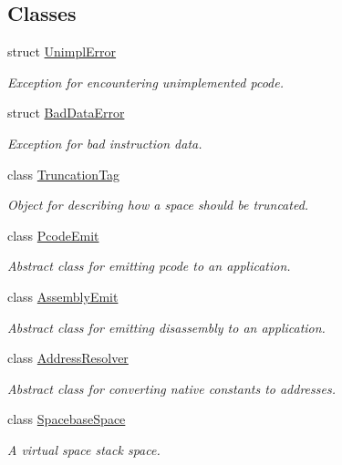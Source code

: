\subsection*{Classes}
\begin{DoxyCompactItemize}
\item 
struct \mbox{\hyperlink{struct_unimpl_error}{Unimpl\+Error}}
\begin{DoxyCompactList}\small\item\em Exception for encountering unimplemented pcode. \end{DoxyCompactList}\item 
struct \mbox{\hyperlink{struct_bad_data_error}{Bad\+Data\+Error}}
\begin{DoxyCompactList}\small\item\em Exception for bad instruction data. \end{DoxyCompactList}\item 
class \mbox{\hyperlink{class_truncation_tag}{Truncation\+Tag}}
\begin{DoxyCompactList}\small\item\em Object for describing how a space should be truncated. \end{DoxyCompactList}\item 
class \mbox{\hyperlink{class_pcode_emit}{Pcode\+Emit}}
\begin{DoxyCompactList}\small\item\em Abstract class for emitting pcode to an application. \end{DoxyCompactList}\item 
class \mbox{\hyperlink{class_assembly_emit}{Assembly\+Emit}}
\begin{DoxyCompactList}\small\item\em Abstract class for emitting disassembly to an application. \end{DoxyCompactList}\item 
class \mbox{\hyperlink{class_address_resolver}{Address\+Resolver}}
\begin{DoxyCompactList}\small\item\em Abstract class for converting native constants to addresses. \end{DoxyCompactList}\item 
class \mbox{\hyperlink{class_spacebase_space}{Spacebase\+Space}}
\begin{DoxyCompactList}\small\item\em A virtual space {\itshape stack} space. \end{DoxyCompactList}\item 

\end{DoxyCompactItemize}
